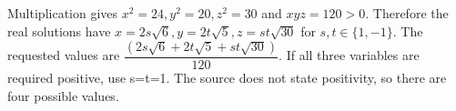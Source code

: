 Multiplication gives $x^2=24,y^2=20,z^2=30$ and $xyz=120>0$. Therefore the real solutions have $x=2s\sqrt6,y=2t\sqrt5,z=st\sqrt{30}$ for $s,t\in\{1,-1\}$. The requested values are $\boxed{\dfrac{(2s\sqrt6+2t\sqrt5+st\sqrt{30})}{120}}$. If all three variables are required positive, use s=t=1. The source does not state positivity, so there are four possible values.
